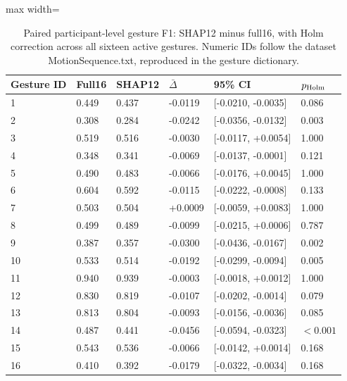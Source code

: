 \begin{table}[htbp]
\centering\small
\caption{Paired participant-level gesture F1: SHAP12 minus full16, with Holm correction across all sixteen active gestures. Numeric IDs follow the dataset MotionSequence.txt, reproduced in the gesture dictionary.}\label{tab:gesture}
\begin{adjustbox}{max width=\textwidth}
\begin{tabular}{llllll}\toprule
Gesture ID & Full16 & SHAP12 & $\bar\Delta$ & 95\% CI & $p_{\rm Holm}$\\\midrule
1 & 0.449 & 0.437 & -0.0119 & [-0.0210, -0.0035] & 0.086\\
2 & 0.308 & 0.284 & -0.0242 & [-0.0356, -0.0132] & 0.003\\
3 & 0.519 & 0.516 & -0.0030 & [-0.0117, +0.0054] & 1.000\\
4 & 0.348 & 0.341 & -0.0069 & [-0.0137, -0.0001] & 0.121\\
5 & 0.490 & 0.483 & -0.0066 & [-0.0176, +0.0045] & 1.000\\
6 & 0.604 & 0.592 & -0.0115 & [-0.0222, -0.0008] & 0.133\\
7 & 0.503 & 0.504 & +0.0009 & [-0.0059, +0.0083] & 1.000\\
8 & 0.499 & 0.489 & -0.0099 & [-0.0215, +0.0006] & 0.787\\
9 & 0.387 & 0.357 & -0.0300 & [-0.0436, -0.0167] & 0.002\\
10 & 0.533 & 0.514 & -0.0192 & [-0.0299, -0.0094] & 0.005\\
11 & 0.940 & 0.939 & -0.0003 & [-0.0018, +0.0012] & 1.000\\
12 & 0.830 & 0.819 & -0.0107 & [-0.0202, -0.0014] & 0.079\\
13 & 0.813 & 0.804 & -0.0093 & [-0.0156, -0.0036] & 0.085\\
14 & 0.487 & 0.441 & -0.0456 & [-0.0594, -0.0323] & $<0.001$\\
15 & 0.543 & 0.536 & -0.0066 & [-0.0142, +0.0014] & 0.168\\
16 & 0.410 & 0.392 & -0.0179 & [-0.0322, -0.0034] & 0.168\\
\bottomrule\end{tabular}
\end{adjustbox}
\end{table}
